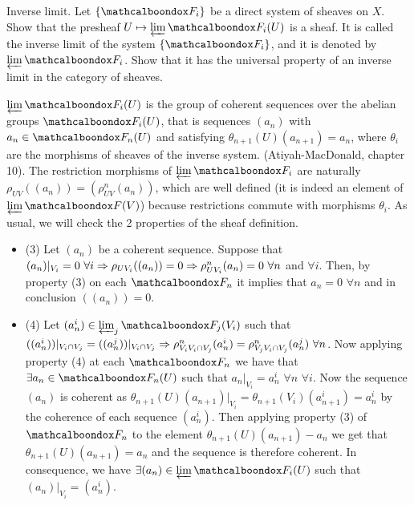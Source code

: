 \begin{ex}
	Inverse limit. Let $\{\sF_i\}$ be a direct system of sheaves on $X$. Show that the presheaf $U \mapsto \varprojlim \sF_i (U)$ is a sheaf. It is called the inverse limit of the system $\{\sF_i\}$, and it is denoted by $\varprojlim \sF_i$. Show that it has the universal property of an inverse limit in the category of sheaves.
\end{ex}

\begin{sol}
	$\varprojlim \sF_i (U)$ is the group of coherent sequences over the abelian groups $\sF_i(U)$, that is sequences $(a_n)$ with $a_n \in \sF_n(U)$ and satisfying $\theta_{n+1}(U)(a_{n+1}) = a_n$, where $\theta_i$ are the morphisms of sheaves of the inverse system. (Atiyah-MacDonald, chapter 10). The restriction morphisms of $\varprojlim \sF_i$ are naturally $\rho_{UV}((a_n)) = (\rho^n_{UV}(a_n))$, which are well defined (it is indeed an element of $\varprojlim \sF(V)$) because restrictions commute with morphisms $\theta_i$. As usual, we will check the 2 properties of the sheaf definition.
	\begin{itemize}
		\item (3) Let $(a_n)$ be a coherent sequence. Suppose that $(a_n)|_{V_i} = 0 \, \, \forall i \Rightarrow \rho_{UV_i}((a_n)) = 0 \Rightarrow \rho^n_{UV_i}(a_n) = 0 \, \, \forall n$ and $\forall i$. Then, by property (3) on each $\sF_n$ it implies that $a_n = 0 \, \, \forall n$ and in conclusion $((a_n)) = 0$.

		\item (4) Let $(a^i_n) \in \varprojlim_j \sF_j(V_i)$ such that $((a^i_n))|_{V_i \cap V_j} =((a^j_n))|_{V_i \cap V_j} \Rightarrow \rho^n_{V_i V_i \cap V_j}(a^i_n) = \rho^n_{V_j V_i \cap V_j}(a^j_n) \, \, \forall n$. Now applying property (4) at each $\sF_n$ we have that $\exists a_n \in \sF_n(U)$ such that $a_n|_{V_i} = a^i_n \, \, \forall n \, \, \forall i$. Now the sequence $(a_n)$ is coherent as $\theta_{n+1}(U)(a_{n+1})|_{V_i} = \theta_{n+1}(V_i)(a^i_{n+1}) = a_n^i$ by the coherence of each sequence $(a_n^i)$. Then applying property (3) of $\sF_n$ to the element $\theta_{n+1}(U)(a_{n+1})-a_n$ we get that $\theta_{n+1}(U)(a_{n+1}) = a_n$ and the sequence is therefore coherent. In consequence, we have $\exists (a_n) \in \varprojlim \sF_i (U)$ such that $(a_n)|_{V_i} = (a_n^i)$.
	\end{itemize}


\end{sol}
